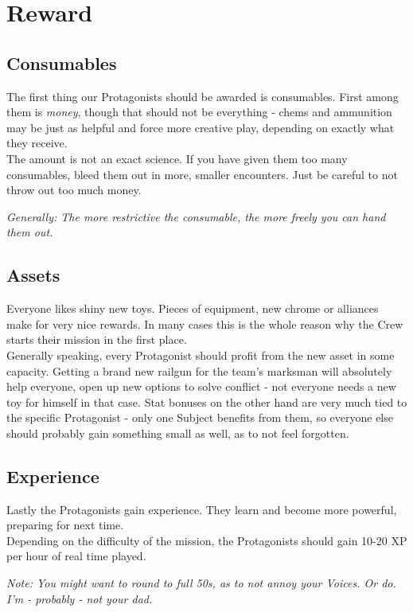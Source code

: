 \section{Reward}
\subsection{Consumables}
The first thing our Protagonists should be awarded is consumables.
First among them is \emph{money}, though that should not be everything
	- chems and ammunition may be just as helpful and force more creative play,
	depending on exactly what they receive.
\\%
The amount is not an exact science. If you have given them too many consumables, bleed them out in more, smaller encounters. Just be careful to not throw out too much money.
\begin{exampleblock}
\textit{Generally: The more restrictive the consumable, the more freely you can hand them out.}
\end{exampleblock}
\subsection{Assets}
Everyone likes shiny new toys.
Pieces of equipment, new chrome or alliances make for very nice rewards.
In many cases this is the whole reason why the Crew starts their mission in the first place.
\\%
Generally speaking, every Protagonist should profit from the new asset in some capacity.
Getting a brand new railgun for the team's marksman will absolutely help everyone,
	open up new options to solve conflict
	- not everyone needs a new toy for himself in that case.
Stat bonuses on the other hand are very much tied to the specific Protagonist
	- only one Subject benefits from them,
	so everyone else should probably gain something small as well,
	as to not feel forgotten.
\subsection{Experience}
Lastly the Protagonists gain experience.
They learn and become more powerful, preparing for next time.
\\%
Depending on the difficulty of the mission,
	the Protagonists should gain 10-20 XP per hour of real time played.\\
\begin{exampleblock}
\textit{Note: You might want to round to full 50s, as to not annoy your Voices. Or do. I'm - probably - not your dad.}
\end{exampleblock}
